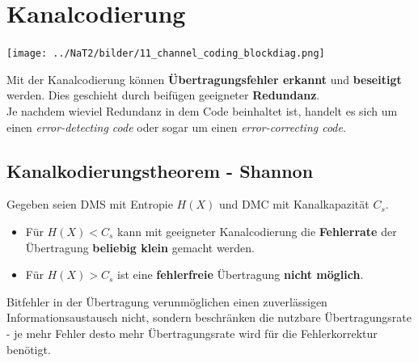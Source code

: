 \section{Kanalcodierung } 
\begin{center}
	\texttt{[image: ../NaT2/bilder/11\_channel\_coding\_blockdiag.png]}
\end{center}

Mit der Kanalcodierung können \textbf{Übertragungsfehler erkannt} und \textbf{beseitigt} werden.
Dies geschieht durch beifügen geeigneter \textbf{Redundanz}. \\
Je nachdem wieviel Redundanz in dem Code beinhaltet ist, handelt es sich um einen \textit{error-detecting
code} oder sogar um einen \textit{error-correcting code}.

\subsection{Kanalkodierungstheorem - Shannon }
Gegeben seien DMS mit Entropie $H(X)$ und DMC mit Kanalkapazität $C_s$. 

\begin{itemize}
  	\item Für $H(X) < C_s$ kann mit geeigneter Kanalcodierung die \textbf{Fehlerrate} der
  	Übertragung \textbf{beliebig klein} gemacht werden. 
	\item Für $H(X) > C_s$ ist eine \textbf{fehlerfreie} Übertragung \textbf{nicht möglich}.
\end{itemize}
Bitfehler in der Übertragung verunmöglichen einen zuverlässigen Informationsaustausch nicht,
sondern beschränken die nutzbare Übertragungsrate - je mehr Fehler desto mehr Übertragungsrate
wird für die Fehlerkorrektur benötigt. \\

